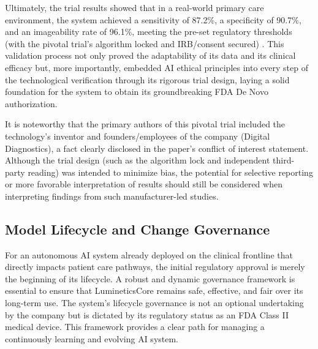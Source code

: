 \documentclass[sigplan,screen]{acmart}
\begin{document}
Ultimately, the trial results showed that in a real-world primary care environment, the system achieved a sensitivity of 87.2\%, a specificity of 90.7\%, and an imageability rate of 96.1\%, meeting the pre-set regulatory thresholds (with the pivotal trial's algorithm locked and IRB/consent secured) \cite{fda2018denovo_summary, abramoff2018pivotal}. This validation process not only proved the adaptability of its data and its clinical efficacy but, more importantly, embedded AI ethical principles into every step of the technological verification through its rigorous trial design, laying a solid foundation for the system to obtain its groundbreaking FDA De Novo authorization.

It is noteworthy that the primary authors of this pivotal trial included the technology's inventor and founders/employees of the company (Digital Diagnostics), a fact clearly disclosed in the paper's conflict of interest statement. Although the trial design (such as the algorithm lock and independent third-party reading) was intended to minimize bias, the potential for selective reporting or more favorable interpretation of results should still be considered when interpreting findings from such manufacturer-led studies.

\subsection{Model Lifecycle and Change Governance}

For an autonomous AI system already deployed on the clinical frontline that directly impacts patient care pathways, the initial regulatory approval is merely the beginning of its lifecycle. A robust and dynamic governance framework is essential to ensure that LumineticsCore remains safe, effective, and fair over its long-term use. The system's lifecycle governance is not an optional undertaking by the company but is dictated by its regulatory status as an FDA Class II medical device. This framework provides a clear path for managing a continuously learning and evolving AI system.
\end{document}
